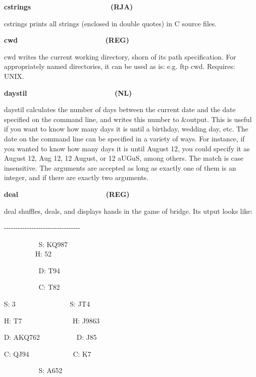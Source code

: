{\sffamily\bfseries
cstrings\ \ \ \ \ \ \ \ \ \ \ \ \ \ \ \ \ \ \ \ (RJA)}

\textsf{cstrings} prints all strings (enclosed in double quotes) in C
source files. 

{\sffamily\bfseries
cwd\ \ \ \ \ \ \ \ \ \ \ \ \ \ \ \ \ \ \ \ \ \ (REG)}

\textsf{cwd} writes the current working directory, shorn of its path
specification. For appropriately named directories, it can be used as
is: e.g. \textsf{ftp {\textasciigrave}cwd{\textasciigrave}}. Requires:
UNIX. 

{\sffamily\bfseries
daystil\ \ \ \ \ \ \ \ \ \ \ \ \ \ \ \ \ \ \ \  \ \ (NL)}

\textsf{daystil} calculates the number of days between the current date
and the date specified on the command line, and writes this number to
\&output. This is useful if you want to know how many days it is until
a birthday, wedding day, etc. The date on the command line can be
specified in a variety of ways. For instance, if you wanted to know how
many days it is until August 12, you could specify it as
{\textquotedbl}August 12{\textquotedbl}, {\textquotedbl}Aug
12{\textquotedbl}, {\textquotedbl}12 August{\textquotedbl}, or
{\textquotedbl}12 aUGuS{\textquotedbl}, among others. The match is case
insensitive. The arguments are accepted as long as exactly one of them
is an integer, and if there are exactly two arguments. 

{\sffamily\bfseries
deal\ \ \ \ \ \ \ \ \ \ \ \ \ \ \ \ \ \ \ \ \ \ (REG)}

\textsf{deal} shuffles, deals, and displays hands in the game of bridge.
Its utput looks like:

{\ttfamily
{}-{}-{}-{}-{}-{}-{}-{}-{}-{}-{}-{}-{}-{}-{}-{}-{}-{}-{}-{}-{}-{}-{}-{}-{}-{}-{}-{}-{}-{}-{}-{}-{}-}

{\ttfamily
\ \ \ \ \ \ \ \ \ \ S: KQ987\\
 \ \ \ \ \ \ \ \ \ H: 52}

{\ttfamily
\ \ \ \ \ \ \ \ \ \ D: T94}

{\ttfamily
\ \ \ \ \ \ \ \ \ \ C: T82}

{\ttfamily
S: 3 \ \ \ \ \ \ \ \ \ \ \ \ \ \ \ S: JT4}

{\ttfamily
H: T7 \ \ \ \ \ \ \ \ \ \ \ \ \ \ H: J9863}

{\ttfamily
D: AKQ762 \ \ \ \ \ \ \ \ \ \ D: J85}

{\ttfamily
C: QJ94 \ \ \ \ \ \ \ \ \ \ \ \ C: K7}

{\ttfamily
\ \ \ \ \ \ \ \ \ \ S: A652}

